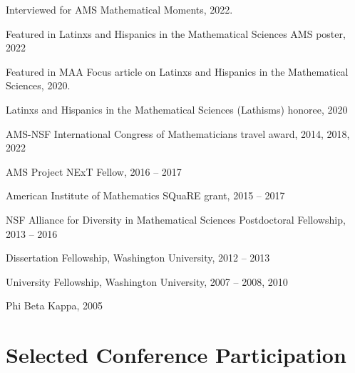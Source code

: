 \documentclass[10pt,letterpaper]{article}
\renewenvironment{itemize}{
  \begin{list}{}{
    \setlength{\leftmargin}{1.5em}
    \setlength{\itemsep}{0.25em}
    \setlength{\parskip}{0pt}
    \setlength{\parsep}{0.25em}
  }
}{
  \end{list}
}
\providecommand{\tightlist}{%
  \setlength{\itemsep}{0pt}\setlength{\parskip}{0pt}}
\let\tightlist\relax
\begin{document}
\begin{itemize}
\tightlist
\item
  Interviewed for AMS Mathematical Moments, 2022.
\item
  Featured in Latinxs and Hispanics in the Mathematical Sciences AMS
  poster, 2022
\item
  Featured in MAA Focus article on Latinxs and Hispanics in the
  Mathematical Sciences, 2020.
\item
  Latinxs and Hispanics in the Mathematical Sciences (Lathisms) honoree,
  2020
\item
  AMS-NSF International Congress of Mathematicians travel award, 2014,
  2018, 2022
\item
  AMS Project NExT Fellow, 2016 -- 2017
\item
  American Institute of Mathematics SQuaRE grant, 2015 -- 2017
\item
  NSF Alliance for Diversity in Mathematical Sciences Postdoctoral
  Fellowship, 2013 -- 2016
\item
  Dissertation Fellowship, Washington University, 2012 -- 2013
\item
  University Fellowship, Washington University, 2007 -- 2008, 2010
\item
  Phi Beta Kappa, 2005
\end{itemize}

\hypertarget{selected-conference-participation}{%
\section*{Selected Conference
Participation}\label{selected-conference-participation}}
\end{document}
